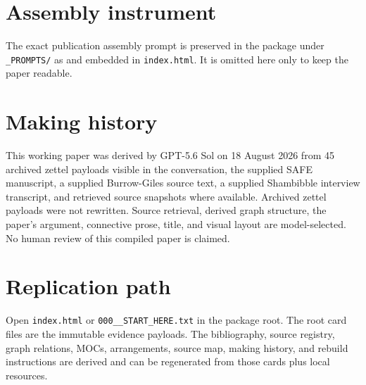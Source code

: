 \documentclass[11pt]{article}
\begin{document}
\printbibliography

\appendix
\section{Assembly instrument}
The exact publication assembly prompt is preserved in the package under \texttt{\_PROMPTS/} as  and embedded in \texttt{index.html}. It is omitted here only to keep the paper readable.

\section{Making history}
This working paper was derived by GPT-5.6 Sol on 18 August 2026 from 45 archived zettel payloads visible in the conversation, the supplied SAFE manuscript, a supplied Burrow-Giles source text, a supplied Shambibble interview transcript, and retrieved source snapshots where available. Archived zettel payloads were not rewritten. Source retrieval, derived graph structure, the paper's argument, connective prose, title, and visual layout are model-selected. No human review of this compiled paper is claimed.

\section{Replication path}
Open \texttt{index.html} or \texttt{000\_\_START\_HERE.txt} in the package root. The root card files are the immutable evidence payloads. The bibliography, source registry, graph relations, MOCs, arrangements, source map, making history, and rebuild instructions are derived and can be regenerated from those cards plus local resources.
\end{document}
